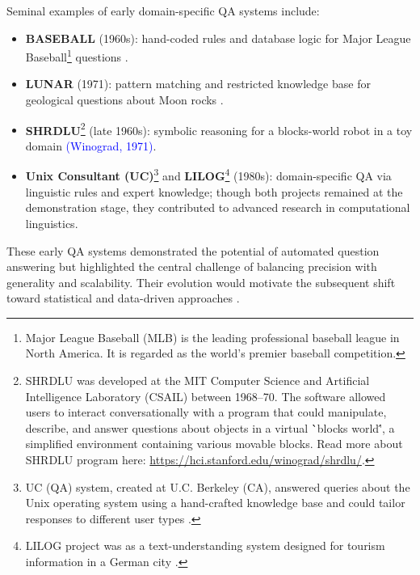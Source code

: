 \begin{spacing}{1.5}
Seminal examples of early domain-specific QA systems include:
\begin{itemize}
    \item \textbf{BASEBALL} (1960s): hand-coded rules and database logic for Major League Baseball\footnote{Major League Baseball (MLB) is the leading professional baseball league in North America. It is regarded as the world’s premier baseball competition.} questions \citep{green_baseball_1961}.
    \item \textbf{LUNAR} (1971): pattern matching and restricted knowledge base for geological questions about Moon rocks \citep{woods_lunar_1972}.
    \item \textbf{SHRDLU}\footnote{SHRDLU was developed at the MIT Computer Science and Artificial Intelligence Laboratory (CSAIL) between 1968--70. The software allowed users to interact conversationally with a program that could manipulate, describe, and answer questions about objects in a virtual \``blocks world\'', a simplified environment containing various movable blocks. Read more about SHRDLU program here: \url{https://hci.stanford.edu/winograd/shrdlu/}.} (late 1960s): symbolic reasoning for a blocks-world robot in a toy domain \textcolor{blue}{(Winograd, 1971)}.
    \item \textbf{Unix Consultant (UC)}\footnote{UC (QA) system, created at U.C. Berkeley (CA), answered queries about the Unix operating system using a hand-crafted knowledge base and could tailor responses to different user types \citep{robert_berkeley_1988}.}  and \textbf{LILOG}\footnote{LILOG project was as a text-understanding system designed for tourism information in a German city \citep{noauthor_question_2025}.} (1980s): domain-specific QA via linguistic rules and expert knowledge; though both projects remained at the demonstration stage, they contributed to advanced research in computational linguistics.
\end{itemize}

These early QA systems demonstrated the potential of automated question answering but highlighted the central challenge of balancing precision with generality and scalability. Their evolution would motivate the subsequent shift toward statistical and data-driven approaches \citep{jurafsky_chapter_2024, antoniou_survey_2022}.


\end{spacing}
